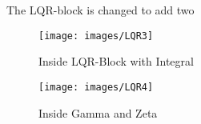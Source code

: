       

The LQR-block is changed to add two 


\begin{figure}[!htb]
 \centering
    \texttt{[image: images/LQR3]}
       \caption{Inside LQR-Block with Integral}
    \label{sim:4}
\end{figure}



\begin{figure}[!htb]
 \centering
    \texttt{[image: images/LQR4]}
       \caption{Inside Gamma and Zeta}
    \label{sim:5}
\end{figure}

